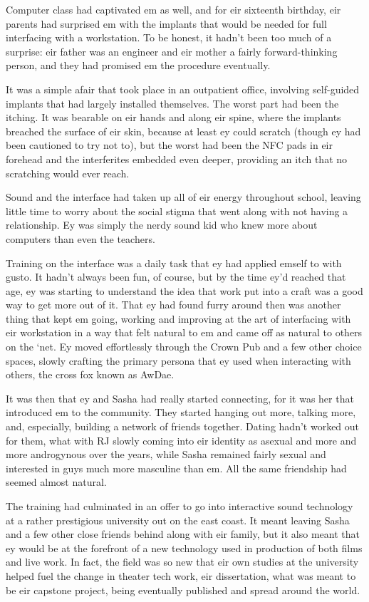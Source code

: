 Computer class had captivated em as well, and for eir sixteenth birthday, eir parents had surprised em with the implants that would be needed for full interfacing with a workstation.  To be honest, it hadn't been too much of a surprise: eir father was an engineer and eir mother a fairly forward-thinking person, and they had promised em the procedure eventually.

It was a simple afair that took place in an outpatient office, involving self-guided implants that had largely installed themselves.  The worst part had been the itching.  It was bearable on eir hands and along eir spine, where the implants breached the surface of eir skin, because at least ey could scratch (though ey had been cautioned to try not to), but the worst had been the NFC pads in eir forehead and the interferites embedded even deeper, providing an itch that no scratching would ever reach.

Sound and the interface had taken up all of eir energy throughout school, leaving little time to worry about the social stigma that went along with not having a relationship.  Ey was simply the nerdy sound kid who knew more about computers than even the teachers.

Training on the interface was a daily task that ey had applied emself to with gusto.  It hadn't always been fun, of course, but by the time ey'd reached that age, ey was starting to understand the idea that work put into a craft was a good way to get more out of it.  That ey had found furry around then was another thing that kept em going, working and improving at the art of interfacing with eir workstation in a way that felt natural to em and came off as natural to others on the `net.  Ey moved effortlessly through the Crown Pub and a few other choice spaces, slowly crafting the primary persona that ey used when interacting with others, the cross fox known as AwDae.

It was then that ey and Sasha had really started connecting, for it was her that introduced em to the community.  They started hanging out more, talking more, and, especially, building a network of friends together.  Dating hadn't worked out for them, what with RJ slowly coming into eir identity as asexual and more and more androgynous over the years, while Sasha remained fairly sexual and interested in guys much more masculine than em.  All the same friendship had seemed almost natural.

The training had culminated in an offer to go into interactive sound technology at a rather prestigious university out on the east coast.  It meant leaving Sasha and a few other close friends behind along with eir family, but it also meant that ey would be at the forefront of a new technology used in production of both films and live work.  In fact, the field was so new that eir own studies at the university helped fuel the change in theater tech work, eir dissertation, what was meant to be eir capstone project, being eventually published and spread around the world.

